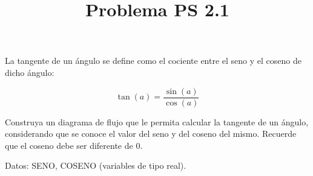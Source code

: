 \documentclass[11pt]{amsart}
\title{Problema PS 2.1}
\author{}
\begin{document}
\maketitle
La tangente de un ángulo se define como el cociente entre el seno y el coseno de dicho ángulo:

\[
\tan(a) = \frac{\sin(a)}{\cos(a)}
\]

Construya un diagrama de flujo que le permita calcular la tangente de un ángulo, considerando que se conoce el valor del seno y del coseno del mismo. Recuerde que el coseno debe ser diferente de 0.

Datos: SENO, COSENO (variables de tipo real).
\end{document}
